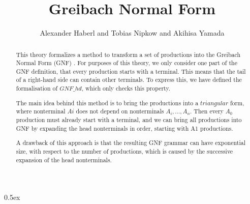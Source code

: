 \documentclass[11pt,a4paper]{article}
\begin{document}
\title{Greibach Normal Form}
\author{Alexander Haberl and Tobias Nipkow and Akihisa Yamada}
\maketitle

\begin{abstract}
This theory formalizes a method to transform a set of productions into the Greibach Normal Form (GNF) \cite{Greibach}. For purposes of this theory, we only consider one part of the GNF definition, that every production starts with a terminal. This means that the tail of a right-hand side can contain other terminals. To express this, we have defined the formalisation of $GNF\_hd$, which only checks this property.

The main idea behind this method is to bring the productions into a $triangular$ form, where nonterminal $Ai$ does not depend on nonterminals $A_i, …, A_n$. Then every $A_0$ production must already start with a terminal, and we can bring all productions into GNF by expanding the head nonterminals in order, starting with A1 productions.

A drawback of this approach is that the resulting GNF grammar can have exponential size, with respect to the number of productions, which is caused by the successive expansion of the head nonterminals.
\end{abstract}

\parindent 0pt\parskip 0.5ex





\end{document}
